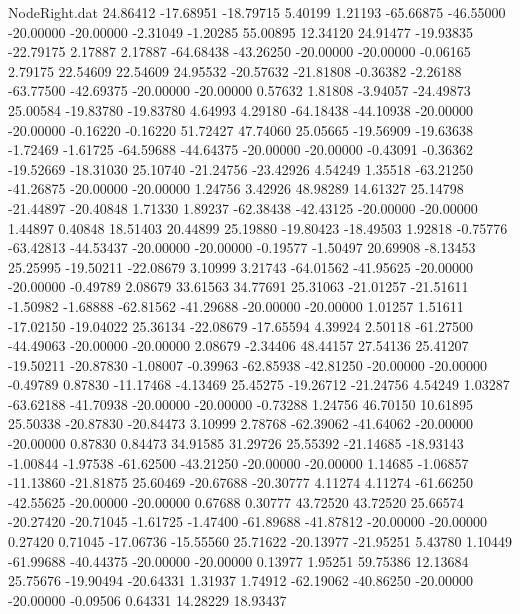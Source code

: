 \begin{filecontents}{NodeRight.dat}
  24.86412  -17.68951  -18.79715     5.40199    1.21193  -65.66875  -46.55000  -20.00000  -20.00000   -2.31049   -1.20285   55.00895   12.34120
  24.91477  -19.93835  -22.79175     2.17887    2.17887  -64.68438  -43.26250  -20.00000  -20.00000   -0.06165    2.79175   22.54609   22.54609
  24.95532  -20.57632  -21.81808    -0.36382   -2.26188  -63.77500  -42.69375  -20.00000  -20.00000    0.57632    1.81808   -3.94057  -24.49873
  25.00584  -19.83780  -19.83780     4.64993    4.29180  -64.18438  -44.10938  -20.00000  -20.00000   -0.16220   -0.16220   51.72427   47.74060
  25.05665  -19.56909  -19.63638    -1.72469   -1.61725  -64.59688  -44.64375  -20.00000  -20.00000   -0.43091   -0.36362  -19.52669  -18.31030
  25.10740  -21.24756  -23.42926     4.54249    1.35518  -63.21250  -41.26875  -20.00000  -20.00000    1.24756    3.42926   48.98289   14.61327
  25.14798  -21.44897  -20.40848     1.71330    1.89237  -62.38438  -42.43125  -20.00000  -20.00000    1.44897    0.40848   18.51403   20.44899
  25.19880  -19.80423  -18.49503     1.92818   -0.75776  -63.42813  -44.53437  -20.00000  -20.00000   -0.19577   -1.50497   20.69908   -8.13453
  25.25995  -19.50211  -22.08679     3.10999    3.21743  -64.01562  -41.95625  -20.00000  -20.00000   -0.49789    2.08679   33.61563   34.77691
  25.31063  -21.01257  -21.51611    -1.50982   -1.68888  -62.81562  -41.29688  -20.00000  -20.00000    1.01257    1.51611  -17.02150  -19.04022
  25.36134  -22.08679  -17.65594     4.39924    2.50118  -61.27500  -44.49063  -20.00000  -20.00000    2.08679   -2.34406   48.44157   27.54136
  25.41207  -19.50211  -20.87830    -1.08007   -0.39963  -62.85938  -42.81250  -20.00000  -20.00000   -0.49789    0.87830  -11.17468   -4.13469
  25.45275  -19.26712  -21.24756     4.54249    1.03287  -63.62188  -41.70938  -20.00000  -20.00000   -0.73288    1.24756   46.70150   10.61895
  25.50338  -20.87830  -20.84473     3.10999    2.78768  -62.39062  -41.64062  -20.00000  -20.00000    0.87830    0.84473   34.91585   31.29726
  25.55392  -21.14685  -18.93143    -1.00844   -1.97538  -61.62500  -43.21250  -20.00000  -20.00000    1.14685   -1.06857  -11.13860  -21.81875
  25.60469  -20.67688  -20.30777     4.11274    4.11274  -61.66250  -42.55625  -20.00000  -20.00000    0.67688    0.30777   43.72520   43.72520
  25.66574  -20.27420  -20.71045    -1.61725   -1.47400  -61.89688  -41.87812  -20.00000  -20.00000    0.27420    0.71045  -17.06736  -15.55560
  25.71622  -20.13977  -21.95251     5.43780    1.10449  -61.99688  -40.44375  -20.00000  -20.00000    0.13977    1.95251   59.75386   12.13684
  25.75676  -19.90494  -20.64331     1.31937    1.74912  -62.19062  -40.86250  -20.00000  -20.00000   -0.09506    0.64331   14.28229   18.93437

\end{filecontents}
